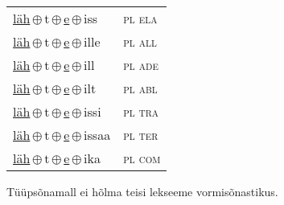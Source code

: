 \begin{minipage}{\textwidth}
\begin{sideways}
\begin{tabular}{l l}
\underline{läh}\,$\oplus$\,t\,$\oplus$\,\underline{e}\,$\oplus$\,iss & \textsc{ pl ela } \\
\underline{läh}\,$\oplus$\,t\,$\oplus$\,\underline{e}\,$\oplus$\,ille & \textsc{ pl all } \\
\underline{läh}\,$\oplus$\,t\,$\oplus$\,\underline{e}\,$\oplus$\,ill & \textsc{ pl ade } \\
\underline{läh}\,$\oplus$\,t\,$\oplus$\,\underline{e}\,$\oplus$\,ilt & \textsc{ pl abl } \\
\underline{läh}\,$\oplus$\,t\,$\oplus$\,\underline{e}\,$\oplus$\,issi & \textsc{ pl tra } \\
\underline{läh}\,$\oplus$\,t\,$\oplus$\,\underline{e}\,$\oplus$\,issaa & \textsc{ pl ter } \\
\underline{läh}\,$\oplus$\,t\,$\oplus$\,\underline{e}\,$\oplus$\,ika & \textsc{ pl com } \\
\end{tabular}
\end{sideways}
\label{tab:tüüpsõnamall-lähe}

\end{minipage}

 
\vspace{1em}
\noindent Tüüpsõnamall  ei hõlma teisi lekseeme vormi\-sõnastikus.
